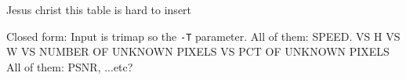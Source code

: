 \documentclass{article}
\theoremstyle{definition}
\begin{document}
\begin{multicols}{2}[]
Jesus christ this table is hard to insert



Closed form: Input is trimap so the \verb|-T| parameter.
All of them: SPEED. VS H VS W VS NUMBER OF UNKNOWN PIXELS VS PCT OF UNKNOWN PIXELS
All of them: PSNR, ...etc?


\end{multicols}
\end{document}
